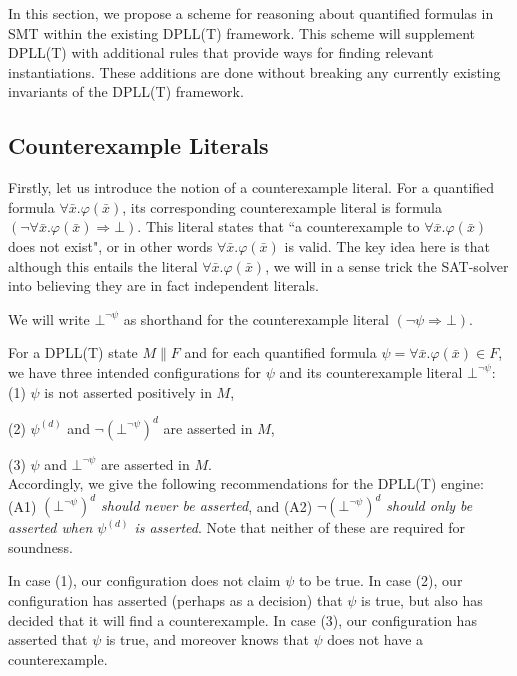 \documentclass{llncs}
\begin{document}
In this section, we propose a scheme for reasoning about quantified formulas in SMT within the existing DPLL(T) framework.
This scheme will supplement DPLL(T) with additional rules that provide ways for finding relevant instantiations.
These additions are done without breaking any currently existing invariants of the DPLL(T) framework.

\subsection{Counterexample Literals}

Firstly, let us introduce the notion of a counterexample literal.
For a quantified formula $\forall \bar{ x }. \varphi( \bar{ x } )$, its corresponding counterexample literal is formula $(\neg \forall \bar{ x }. \varphi( \bar{ x } ) \Rightarrow \bot)$.
This literal states that ``a counterexample to $\forall \bar{ x }. \varphi( \bar{ x } )$ does not exist", or in other words $\forall \bar{ x }. \varphi( \bar{ x } )$ is valid.
The key idea here is that although this entails the literal $\forall \bar{ x }. \varphi( \bar{ x } )$, we will in a sense trick the SAT-solver into believing they are in fact independent literals.

We will write $\bot^{\neg \psi}$ as shorthand for the counterexample literal $(\neg \psi \Rightarrow \bot)$.

For a DPLL(T) state $M \parallel F$ and for each quantified formula $\psi = \forall \bar{ x }. \varphi( \bar{ x } ) \in F$, we have three intended configurations for $\psi$ and its counterexample literal $\bot^{\neg \psi}$: \\

(1) $\psi$ is not asserted positively in $M$, 

(2) $\psi^{(d)}$ and $\neg (\bot^{\neg \psi})^d$ are asserted in $M$, 

(3) $\psi$ and $\bot^{\neg \psi}$ are asserted in $M$. \\

Accordingly, we give the following recommendations for the DPLL(T) engine: (A1) \emph{$(\bot^{\neg \psi})^d$ should never be asserted}, and (A2) \emph{ $\neg (\bot^{\neg \psi})^d$ should only be asserted when $\psi^{(d)}$ is asserted}.
Note that neither of these are required for soundness.

In case (1), our configuration does not claim $\psi$ to be true.
In case (2), our configuration has asserted (perhaps as a decision) that $\psi$ is true, but also has decided that it will find a counterexample.
In case (3), our configuration has asserted that $\psi$ is true, and moreover knows that $\psi$ does not have a counterexample.
\end{document}
